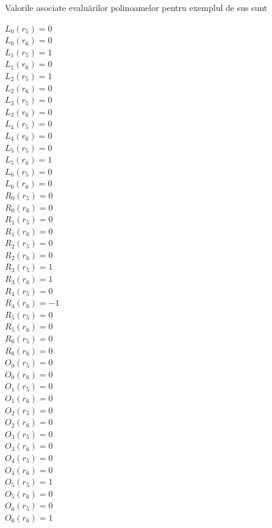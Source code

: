 Valorile asociate evaluărilor polinoamelor pentru exemplul de sus sunt
\begin{multicols}{3}
$L_0(r_5) = 0$ \\
$L_0(r_6) = 0$ \\
$L_1(r_5) = 1$ \\
$L_1(r_6) = 0$ \\
$L_2(r_5) = 1$ \\
$L_2(r_6) = 0$ \\
$L_3(r_5) = 0$ \\
$L_3(r_6) = 0$ \\
$L_4(r_5) = 0$ \\
$L_4(r_6) = 0$ \\
$L_5(r_5) = 0$ \\
$L_5(r_6) = 1$ \\
$L_6(r_5) = 0$ \\
$L_6(r_6) = 0$ \\
\vfill
\columnbreak
$R_0(r_5) = 0$ \\
$R_0(r_6) = 0$ \\
$R_1(r_5) = 0$ \\
$R_1(r_6) = 0$ \\
$R_2(r_5) = 0$ \\
$R_2(r_6) = 0$ \\
$R_3(r_5) = 1$ \\
$R_3(r_6) = 1$ \\
$R_4(r_5) = 0$ \\
$R_4(r_6) = -1$ \\
$R_5(r_5) = 0$ \\
$R_5(r_6) = 0$ \\
$R_6(r_5) = 0$ \\
$R_6(r_6) = 0$ \\
\vfill
\columnbreak
$O_0(r_5) = 0$ \\
$O_0(r_6) = 0$ \\
$O_1(r_5) = 0$ \\
$O_1(r_6) = 0$ \\
$O_2(r_5) = 0$ \\
$O_2(r_6) = 0$ \\
$O_3(r_5) = 0$ \\
$O_3(r_6) = 0$ \\
$O_4(r_5) = 0$ \\
$O_4(r_6) = 0$ \\
$O_5(r_5) = 1$ \\
$O_5(r_6) = 0$ \\
$O_6(r_5) = 0$ \\
$O_6(r_6) = 1$ \\
\end{multicols}


